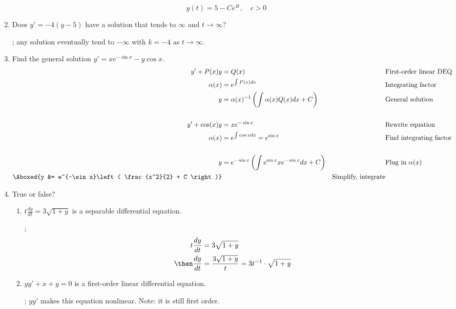 \documentclass{nosvagor-notes}
\begin{document}
\begin{enumerate}
  \[\boxed{y(t) = 5 - Ce^{4t}, \quad c > 0}\]
  \vspace{30pt}

  \item Does \(y'=-4(y-5)\) have a solution that tends to \(\infty\) and \(t \to
  \infty\)?

  ; any solution eventually tend to \(-\infty\) with \(k = -4\) as \(t \to \infty\).
  \vspace{30pt}

  \item Find the general solution \(y' = xe^{-\sin x} - y \cos x\).
  \begin{align*}
    y' + P(x)y &= Q(x)
      && \text{First-order linear DEQ} \\
    \alpha (x) &= e^{\int P(x)dx}
      && \text{Integrating factor} \\
    y &= \alpha (x)^{-1} \left( \int \alpha (x) Q (x) dx + C \right)
      && \text{General solution} \\\\
    y' + \cos (x) y &= xe^{- \sin x}
      && \text{Rewrite equation} \\
    \alpha (x) &= e^{\int \cos x dx } = e^{\sin x}
      && \text{Find integrating factor} \\\\
    y &= e^{-\sin  x} \left( \int e^{\sin x} xe^{-\sin x} dx + C \right)
      && \text{Plug in}~\alpha (x)  \\
    \Aboxed{y &=  e^{-\sin x}\left( \frac{x^2}{2} + C \right)}
      && \text{Simplify, integrate} \\
  \end{align*}

  \newpage

  \item True or false?
  \begin{enumerate}
    \item \(t \frac{dy}{dt} = 3\sqrt{1+y} \) is a separable differential
      equation.

    ;
    \begin{align*}
      t \frac{dy}{dt} &= 3\sqrt{1+y} \\
    \then \frac{dy}{dt} &= \frac{3\sqrt{1+y}}{t} = 3t^{-1} \cdot \sqrt{1+y}
    \end{align*}
    \item \(yy' + x + y = 0\) is a first-order linear differential equation.

    ; \(yy'\) makes this equation nonlinear. Note: it is still
      first order.
  \end{enumerate}
  \vspace{80pt}


\end{enumerate}
\end{document}
